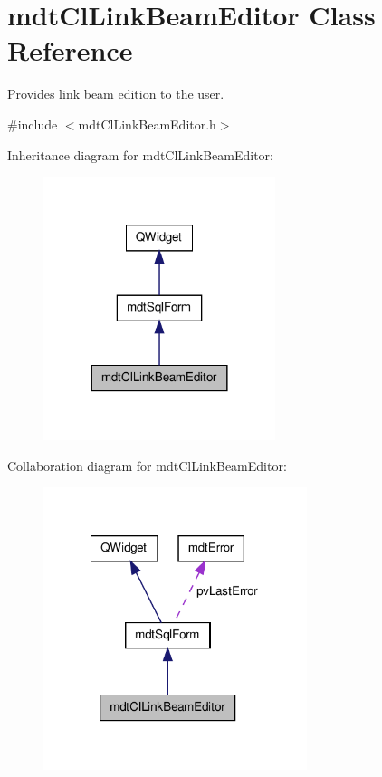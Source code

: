 \hypertarget{classmdt_cl_link_beam_editor}{\section{mdt\-Cl\-Link\-Beam\-Editor Class Reference}
\label{classmdt_cl_link_beam_editor}
}


Provides link beam edition to the user.  




{\ttfamily \#include $<$mdt\-Cl\-Link\-Beam\-Editor.\-h$>$}



Inheritance diagram for mdt\-Cl\-Link\-Beam\-Editor\-:\nopagebreak
\begin{figure}[H]
\begin{center}
\leavevmode
\includegraphics[width=192pt]{classmdt_cl_link_beam_editor__inherit__graph}
\end{center}
\end{figure}


Collaboration diagram for mdt\-Cl\-Link\-Beam\-Editor\-:\nopagebreak
\begin{figure}[H]
\begin{center}
\leavevmode
\includegraphics[width=218pt]{classmdt_cl_link_beam_editor__coll__graph}
\end{center}
\end{figure}
